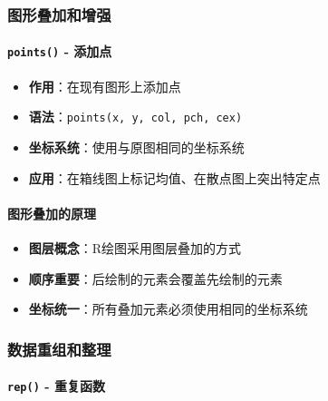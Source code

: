 \documentclass[
]{book}
\providecommand{\tightlist}{%
  \setlength{\itemsep}{0pt}\setlength{\parskip}{0pt}}
\begin{document}
\hypertarget{ux56feux5f62ux53e0ux52a0ux548cux589eux5f3a}{%
\subsubsection{图形叠加和增强}\label{ux56feux5f62ux53e0ux52a0ux548cux589eux5f3a}}

\hypertarget{points---ux6dfbux52a0ux70b9}{%
\paragraph{\texorpdfstring{\texttt{points()} - 添加点}{points() - 添加点}}\label{points---ux6dfbux52a0ux70b9}}

\begin{itemize}
\tightlist
\item
  \textbf{作用}：在现有图形上添加点
\item
  \textbf{语法}：\texttt{points(x,\ y,\ col,\ pch,\ cex)}
\item
  \textbf{坐标系统}：使用与原图相同的坐标系统
\item
  \textbf{应用}：在箱线图上标记均值、在散点图上突出特定点
\end{itemize}

\hypertarget{ux56feux5f62ux53e0ux52a0ux7684ux539fux7406}{%
\paragraph{图形叠加的原理}\label{ux56feux5f62ux53e0ux52a0ux7684ux539fux7406}}

\begin{itemize}
\tightlist
\item
  \textbf{图层概念}：R绘图采用图层叠加的方式
\item
  \textbf{顺序重要}：后绘制的元素会覆盖先绘制的元素
\item
  \textbf{坐标统一}：所有叠加元素必须使用相同的坐标系统
\end{itemize}

\hypertarget{ux6570ux636eux91cdux7ec4ux548cux6574ux7406}{%
\subsubsection{数据重组和整理}\label{ux6570ux636eux91cdux7ec4ux548cux6574ux7406}}

\hypertarget{rep---ux91cdux590dux51fdux6570}{%
\paragraph{\texorpdfstring{\texttt{rep()} - 重复函数}{rep() - 重复函数}}\label{rep---ux91cdux590dux51fdux6570}}
\end{document}
